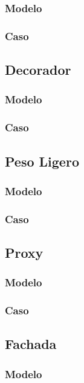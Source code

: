 \subsubsection{Modelo}
\newpage
\subsubsection{Caso}
\newpage

\subsection{Decorador}
\subsubsection{Modelo}
\newpage
\subsubsection{Caso}
\newpage

\subsection{Peso Ligero}
\subsubsection{Modelo}
\newpage
\subsubsection{Caso}
\newpage

\subsection{Proxy}
\subsubsection{Modelo}
\newpage
\subsubsection{Caso}
\newpage

\subsection{Fachada}
\subsubsection{Modelo}
\newpage
